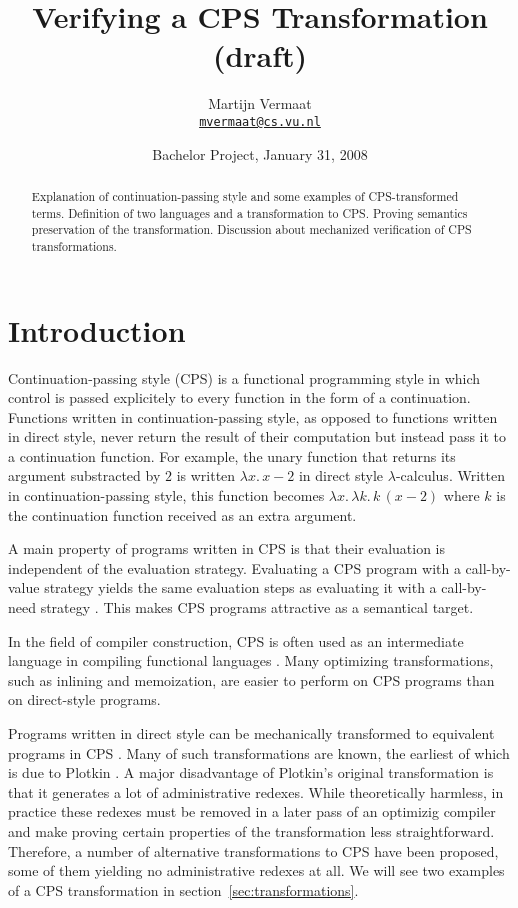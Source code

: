 \documentclass[a4paper,11pt,draft]{article}
\title{\sffamily Verifying a CPS Transformation (draft)}
\author{
  Martijn Vermaat\\[0.3em]
  \href{mailto:mvermaat@cs.vu.nl}{\texttt{mvermaat@cs.vu.nl}}
}
\date{Bachelor Project, January 31, 2008}
\begin{document}
\maketitle


\begin{abstract}
  Explanation of continuation-passing style and some examples of CPS-transformed
  terms. Definition of two languages and a transformation to CPS. Proving
  semantics preservation of the transformation. Discussion about mechanized
  verification of CPS transformations.
\end{abstract}


\section{Introduction}\label{sec:introduction}


Continuation-passing style (CPS) is a functional programming style in which control is
passed explicitely to every function in the form of a continuation. Functions
written in continuation-passing style, as opposed to functions written in direct
style, never return the result of their computation but instead pass it to a
continuation function. For example, the unary function that returns its argument
substracted by $2$ is written $\lambda x. \, x - 2$ in direct style
$\lambda$-calculus. Written in continuation-passing style, this function becomes
$\lambda x. \, \lambda k. \, k \, (x - 2)$ where $k$ is the continuation function
received as an extra argument.

A main property of programs written in CPS is that their evaluation is independent
of the evaluation strategy. Evaluating a CPS program with a call-by-value strategy
yields the same evaluation steps as evaluating it with a call-by-need strategy
\cite{Plotkin-75}. This makes CPS programs attractive as a semantical target.

In the field of compiler construction, CPS is often used as an intermediate language
in compiling functional languages \cite{Appel-92,Orbit-86}. Many optimizing
transformations, such as inlining and memoization, are easier to perform on CPS
programs than on direct-style programs.

Programs written in direct style can be mechanically transformed to equivalent
programs in CPS \cite{Danvy-Filinski-92}. Many of such transformations are known,
the earliest of which is due to Plotkin \cite{Plotkin-75}. A major disadvantage of
Plotkin's original transformation is that it generates a lot of administrative redexes.
While theoretically harmless, in practice these redexes must be removed in a later
pass of an optimizig compiler and make proving certain properties of the transformation
less straightforward. Therefore, a number of alternative transformations to CPS have
been proposed, some of them yielding no administrative redexes at all. We will see two
examples of a CPS transformation in section~\ref{sec:transformations}.
\end{document}
